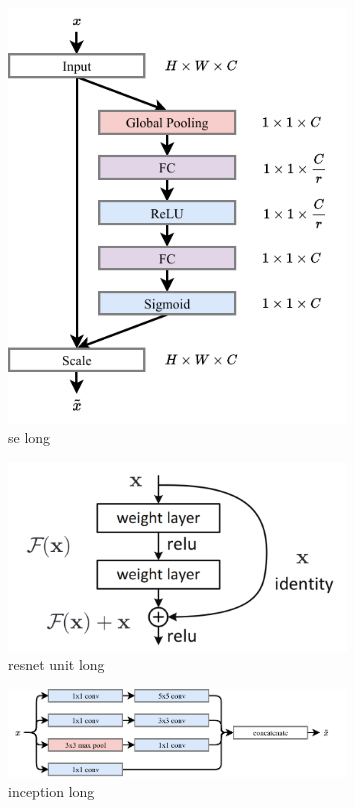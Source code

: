 \begin{figure} %
    \includegraphics[width=0.8\textwidth]{diagrams/7-cvn/se.pdf}
    \caption[se short]
    {se long}
    \label{fig:se}
\end{figure}

\begin{figure} %
    \includegraphics[width=0.8\textwidth]{diagrams/7-cvn/resnet_unit.png}
    \caption[resnet unit short]
    {resnet unit long}
    \label{fig:resnet_unit}
\end{figure}

\begin{figure} %
    \includegraphics[width=0.8\textwidth]{diagrams/7-cvn/inception.pdf}
    \caption[inception short]
    {inception long}
    \label{fig:se}
\end{figure}

